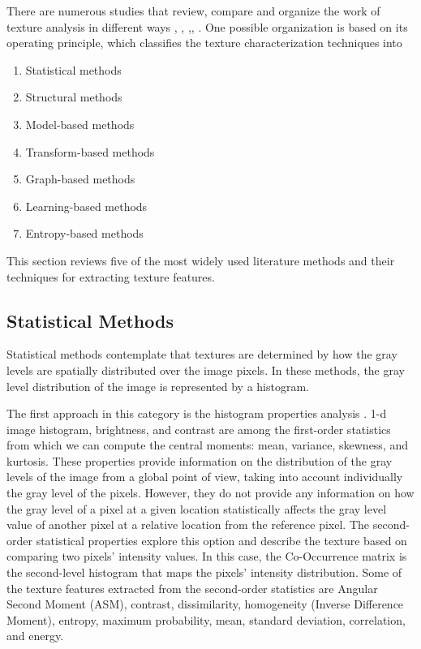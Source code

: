 There are numerous studies that review, compare and organize the work of texture analysis in different ways  \citep{Materka.Strzelecki:Report:1998}, \citep{Zhang.Tan:PR:2002}, \citep{Bharati.Liu.ea:CILS:2004},\citep{Lukashevich.Sadykhov:ICPCI:2012}, \citep{Humeau-Heurtier:ACCESS:2019}. One possible organization is based on its operating principle, which classifies the texture characterization techniques into
 \begin{enumerate}[noitemsep]%
	\item Statistical methods
	\item Structural methods
	\item Model-based methods
	\item Transform-based methods
	\item Graph-based methods
	\item Learning-based methods
	\item Entropy-based methods
\end{enumerate}
This section reviews five of the most widely used literature methods and their techniques for extracting texture features.

\subsection{Statistical Methods}
Statistical methods contemplate that textures are determined by how the gray levels are spatially distributed over the image pixels. In these methods, the gray level distribution of the image is represented by a histogram.

The first approach in this category is the histogram properties analysis \citep{Aggarwal.K.Agrawal:JSIP:2012}. 1-d image histogram, brightness, and contrast are among the first-order statistics from which we can compute the central moments: mean, variance, skewness, and kurtosis. These properties provide information on the distribution of the gray levels of the image from a global point of view, taking into account individually the gray level of the pixels. However, they do not provide any information on how the gray level of a pixel at a given location statistically affects the gray level value of another pixel at a relative location from the reference pixel. 
The second-order statistical properties explore this option and describe the texture based on comparing two pixels' intensity values. In this case, the Co-Occurrence matrix \citep{Haralick.Shanmugam.ea:TSMC:1973} is the second-level histogram that maps the pixels' intensity distribution. Some of the texture features extracted from the second-order statistics are Angular Second Moment (ASM), contrast, dissimilarity, homogeneity (Inverse Difference Moment), entropy, maximum probability, mean, standard deviation, correlation, and energy.

